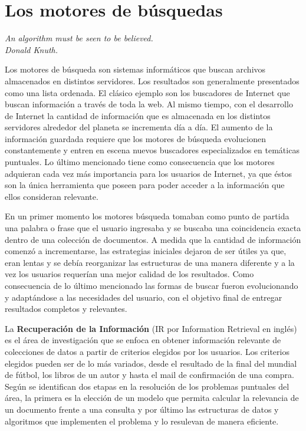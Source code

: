 \section{Los motores de búsquedas}
{\begin{small}%
\begin{flushright}%
\it An algorithm must be seen to be believed.\\Donald Knuth.
\end{flushright}%
\end{small}%
\vspace{.5cm}}
Los motores de búsqueda son sistemas informáticos que buscan archivos almacenados en distintos servidores. Los resultados son generalmente presentados como una lista ordenada. El clásico ejemplo son los buscadores de Internet que buscan información a través de toda la web. Al mismo tiempo, con el desarrollo de Internet la cantidad de información que es almacenada en los distintos servidores alrededor del planeta se incrementa día a día. El aumento de la información guardada requiere que los motores de búsqueda evolucionen constantemente y entren en escena nuevos buscadores especializados en temáticas puntuales. Lo último mencionado tiene como consecuencia que los motores adquieran cada vez más importancia para los usuarios de Internet, ya que éstos son la única herramienta que poseen para poder acceder a la información que ellos consideran relevante.

En un primer momento los motores búsqueda tomaban como punto de partida una palabra o frase que el usuario ingresaba y se buscaba una coincidencia exacta dentro de una colección de documentos. A medida que la cantidad de información comenzó a incrementarse, las estrategias iniciales dejaron de ser útiles ya que, eran lentas y se debía reorganizar las estructuras de una manera diferente y a la vez los usuarios requerían una mejor calidad de los resultados. Como consecuencia de lo último mencionado las formas de buscar fueron evolucionando y adaptándose a las necesidades del usuario, con el objetivo final de entregar resultados completos y relevantes.

La \textbf{Recuperación de la Información} (IR por Information Retrieval en inglés) \cite{Baeza-Yates:1999:MIR:553876,Manning:2008:IIR:1394399,Zobel:2006:IFT:1132956.1132959} es el área de investigación que se enfoca en obtener información relevante de colecciones de datos a partir de criterios elegidos por los usuarios. Los criterios elegidos pueden ser de lo más variados, desde el resultado de la final del mundial de fútbol, los libros de un autor y hasta el mail de confirmación de una compra. Según \cite{Baeza-Yates:1999:MIR:553876} se identifican dos etapas en la resolución de los problemas puntuales del área, la primera es la elección de un modelo que permita calcular la relevancia de un documento frente a una consulta y por último las estructuras de datos y algoritmos que implementen el problema y lo resulevan de manera eficiente.

